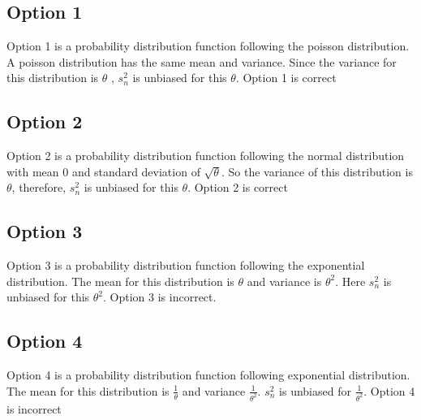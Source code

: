 \documentclass[12pt]{article}
\begin{document}
\subsection{Option 1}
Option 1 is a probability distribution function following the poisson distribution. A poisson distribution has the same mean and variance. Since the variance for this distribution is $\theta$ , $s_{n}^2$ is unbiased for this $\theta$. Option 1 is correct
\subsection{Option 2}
Option 2 is a probability distribution function following the normal distribution with mean 0 and standard deviation of $\sqrt{\theta}$. So the variance of this distribution is $\theta$, therefore, $s_{n}^2$ is unbiased for this $\theta$. Option 2 is correct
\subsection{Option 3}
Option 3 is a probability distribution function following the exponential distribution. The mean for this distribution is $\theta$ and variance is $\theta^{2}$. Here $s_{n}^2$ is unbiased for this $\theta^{2}$. Option 3 is incorrect.
\subsection{Option 4}
Option 4 is a probability distribution function following exponential distribution. The mean for this distribution is $\frac{1}{\theta}$ and variance $\frac{1}{\theta^{2}}$. $s_{n}^2$ is unbiased for $\frac{1}{\theta^{2}}$. Option 4 is incorrect
\end{document}
